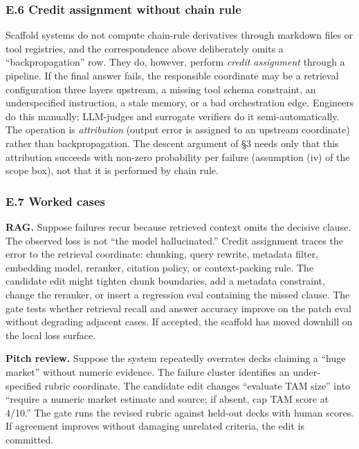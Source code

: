 \subsubsection{E.6 Credit assignment without chain
rule}\label{e.6-credit-assignment-without-chain-rule}

Scaffold systems do not compute chain-rule derivatives through markdown
files or tool registries, and the correspondence above deliberately
omits a ``backpropagation'' row. They do, however, perform \emph{credit
assignment} through a pipeline. If the final answer fails, the
responsible coordinate may be a retrieval configuration three layers
upstream, a missing tool schema constraint, an underspecified
instruction, a stale memory, or a bad orchestration edge. Engineers do
this manually; LLM-judges and surrogate verifiers do it
semi-automatically. The operation is \emph{attribution} (output error is
assigned to an upstream coordinate) rather than backpropagation. The
descent argument of §3 needs only that this attribution succeeds with
non-zero probability per failure (assumption (iv) of the scope box), not
that it is performed by chain rule.

\subsubsection{E.7 Worked cases}\label{e.7-worked-cases}

\textbf{RAG.} Suppose failures recur because retrieved context omits the
decisive clause. The observed loss is not ``the model hallucinated.''
Credit assignment traces the error to the retrieval coordinate:
chunking, query rewrite, metadata filter, embedding model, reranker,
citation policy, or context-packing rule. The candidate edit might
tighten chunk boundaries, add a metadata constraint, change the
reranker, or insert a regression eval containing the missed clause. The
gate tests whether retrieval recall and answer accuracy improve on the
patch eval without degrading adjacent cases. If accepted, the scaffold
has moved downhill on the local loss surface.

\textbf{Pitch review.} Suppose the system repeatedly overrates decks
claiming a ``huge market'' without numeric evidence. The failure cluster
identifies an under-specified rubric coordinate. The candidate edit
changes ``evaluate TAM size'' into ``require a numeric market estimate
and source; if absent, cap TAM score at 4/10.'' The gate runs the
revised rubric against held-out decks with human scores. If agreement
improves without damaging unrelated criteria, the edit is committed.

